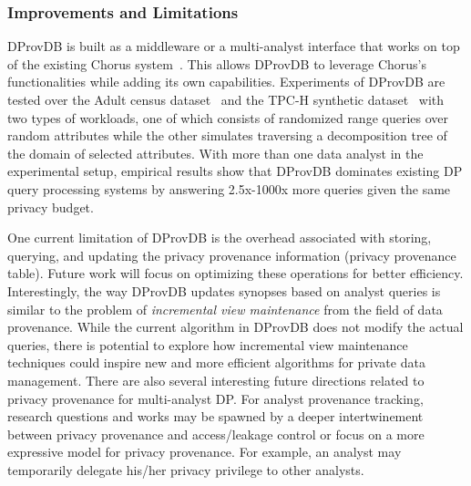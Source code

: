 \subsubsection{Improvements and Limitations}
DProvDB is built as a middleware or a multi-analyst interface that works on top of the existing Chorus system~\cite{johnson2020chorus}. This allows DProvDB to leverage Chorus's functionalities while adding its own capabilities. Experiments of DProvDB are tested over the Adult census dataset~\cite{uci_dataset} and the TPC-H synthetic dataset~\cite{tpch_dataset} with two types of workloads, one of which consists of randomized range queries over random attributes while the other simulates traversing a decomposition tree of the domain of selected attributes.
With more than one data analyst in the experimental setup, empirical results show that DProvDB dominates existing DP query processing systems by answering 2.5x-1000x more queries given the same privacy budget.

One current limitation of DProvDB is the overhead associated with storing, querying, and updating the privacy provenance information (privacy provenance table).  Future work will focus on optimizing these operations for better efficiency.
Interestingly, the way DProvDB updates synopses based on analyst queries is similar to the problem of \textit{incremental view maintenance} from the field of data provenance. While the current algorithm in DProvDB does not modify the actual queries, there is potential to explore how incremental view maintenance techniques could inspire new and more efficient algorithms for private data management. 
There are also several interesting future directions related to privacy provenance for multi-analyst DP. For analyst provenance tracking,  research questions and works may be spawned by a deeper intertwinement between privacy provenance and access/leakage control \cite{Pappachan2022tattletale} or focus on a more expressive model for privacy provenance. For example, an analyst may temporarily delegate his/her privacy privilege to other analysts.



